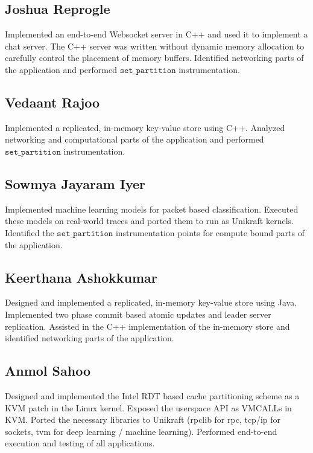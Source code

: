 \documentclass[sigconf,authorversion,noacm]{acmart}
\begin{document}
\subsection{Joshua Reprogle}
Implemented an end-to-end Websocket server in C++ and used it to implement a
chat server. The C++ server was written without dynamic memory allocation to
carefully control the placement of memory buffers. Identified networking parts
of the application and performed $\texttt{set\_partition}$ instrumentation.

\subsection{Vedaant Rajoo}
Implemented a replicated, in-memory key-value store using C++. Analyzed
networking and computational parts of the application and performed
$\texttt{set\_partition}$ instrumentation.

\subsection{Sowmya Jayaram Iyer}
Implemented machine learning models for packet based classification. Executed
these models on real-world traces and ported them to run as Unikraft kernels.
Identified the $\texttt{set\_partition}$ instrumentation points for compute
bound parts of the application.

\subsection{Keerthana Ashokkumar}
Designed and implemented a replicated, in-memory key-value store using Java.
Implemented two phase commit based atomic updates and leader server replication.
Assisted in the C++ implementation of the in-memory store and identified
networking parts of the application.

\subsection{Anmol Sahoo}
Designed and implemented the Intel RDT based cache partitioning scheme as a KVM
patch in the Linux kernel. Exposed the userspace API as VMCALLs in KVM. Ported
the necessary libraries to Unikraft (rpclib for rpc, tcp/ip for sockets, tvm for
deep learning / machine learning). Performed end-to-end execution and testing of
all applications.
\end{document}
